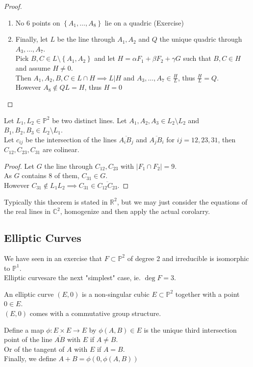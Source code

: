 \documentclass[../main.tex]{subfiles}
\begin{document}
\begin{proof}
\begin{enumerate}
\item No 6 points on $ \left\{ A_1,\ldots, A_8 \right\} $ lie on a quadric (Exercise) 
\item Finally, let $L$ be the line through $A_1, A_2$ and $Q$ the unique quadric through $A_3,\ldots, A_7$.\\
	Pick $B,C\in L \setminus \left\{ A_1,A_2 \right\} $ and let $H = \alpha F_1 + \beta F_2 + \gamma G$ such that $B,C \in H$ and assume $H\neq 0$.\\	
Then $A_1,A_2,B ,C\in L\cap H\implies L|H$ and $A_3, \ldots, A_7\in \frac{H}{L}$, thus $\frac{H}{L}= Q$.\\
However $A_8\notin QL=H$, thus $H=0$ 
\end{enumerate}
\end{proof}
\begin{crly}
Let $L_1,L_2\in \mathbb{P}^{2}$ be two distinct lines. Let $A_1,A_2,A_3\in L_2\setminus L_2$ and $B_1,B_2,B_3\in L_2\setminus L_1$.\\
Let $c_{ij} $ be the intersection of the lines $\overline{A_iB_j}$ and $\overline{A_jB_i}$ for $ij = 12,23,31$, then $C_{12},C_{23}, C_{31}$ are colinear.
\end{crly}
\begin{proof}
Let $G$ the line through $C_{12},C_{23}$ with  $|F_1\cap F_2| = 9$.\\
As $G$ contains $8$ of them, $C_{31}\in G$.\\
However $C_{31}\notin L_1L_2\implies C_{31}\in \overline{C_{12}C_{23}}$.
\end{proof}
\begin{rmq}
Typically this theorem is stated in $\mathbb{R}^{2}$, but we may just consider the equations of the real lines in $ \mathbb{C}^{2}$, homogenize and then apply the actual corolarry.
\end{rmq}
\subsection{Elliptic Curves}
We have seen in an exercise that $F \subset \mathbb{P}^{2}$ of degree 2 and irreducible is isomorphic to $ \mathbb{P}^{1}$.\\
Elliptic curvesare the next "simplest" case, ie. $\deg F =3$.
\begin{defn}
	An elliptic curve $( E,0) $ is a non-singular cubic $E \subset \mathbb{P}^{2}$ together with a point $0\in E$.\\
	$( E,0) $ comes with a commutative group structure.
\end{defn}
Define a map $\phi:E\times E\to E$ by $\phi( A,B) \in E$ is the unique third intersection point of the line $ \overline{AB}$ with $E$ if $A\neq B$.\\
Or of the tangent of $A$ with $E$ if $A=B$.\\
Finally, we define $A+B = \phi( 0, \phi( A,B) ) $ 
\end{document}
